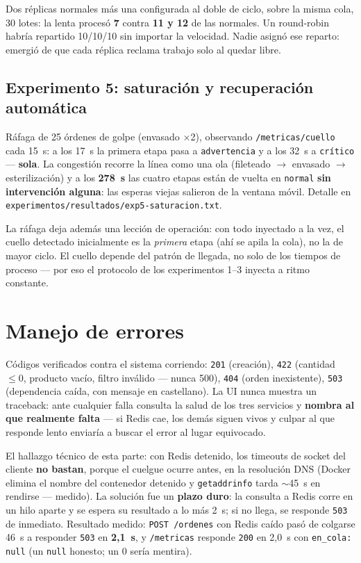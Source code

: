 \documentclass[12pt,a4paper]{article}
\begin{document}
Dos réplicas normales más una configurada al doble de ciclo, sobre la misma
cola, 30 lotes: la lenta procesó \textbf{7} contra \textbf{11 y 12} de las
normales. Un round-robin habría repartido 10/10/10 sin importar la velocidad.
Nadie asignó ese reparto: emergió de que cada réplica reclama trabajo solo al
quedar libre.

\subsection{Experimento 5: saturación y recuperación automática}

Ráfaga de 25 órdenes de golpe (envasado $\times$2), observando
\texttt{/metricas/cuello} cada 15~s: a los 17~s la primera etapa pasa a
\texttt{advertencia} y a los 32~s a \texttt{crítico} — \textbf{sola}. La
congestión recorre la línea como una ola (fileteado $\to$ envasado $\to$
esterilización) y a los \textbf{278~s} las cuatro etapas están de vuelta en
\texttt{normal} \textbf{sin intervención alguna}: las esperas viejas salieron
de la ventana móvil. Detalle en \texttt{experimentos/resultados/exp5-saturacion.txt}.

La ráfaga deja además una lección de operación: con todo inyectado a la vez, el
cuello detectado inicialmente es la \emph{primera} etapa (ahí se apila la
cola), no la de mayor ciclo. El cuello depende del patrón de llegada, no solo
de los tiempos de proceso — por eso el protocolo de los experimentos 1--3
inyecta a ritmo constante.

\section{Manejo de errores}

Códigos verificados contra el sistema corriendo: \texttt{201} (creación),
\texttt{422} (cantidad $\leq 0$, producto vacío, filtro inválido — nunca 500),
\texttt{404} (orden inexistente), \texttt{503} (dependencia caída, con mensaje
en castellano). La UI nunca muestra un traceback: ante cualquier falla consulta
la salud de los tres servicios y \textbf{nombra al que realmente falta} — si
Redis cae, los demás siguen vivos y culpar al que responde lento enviaría a
buscar el error al lugar equivocado.

El hallazgo técnico de esta parte: con Redis detenido, los timeouts de socket
del cliente \textbf{no bastan}, porque el cuelgue ocurre antes, en la
resolución DNS (Docker elimina el nombre del contenedor detenido y
\texttt{getaddrinfo} tarda $\sim$45~s en rendirse — medido). La solución fue un
\textbf{plazo duro}: la consulta a Redis corre en un hilo aparte y se espera su
resultado a lo más 2~s; si no llega, se responde \texttt{503} de inmediato.
Resultado medido: \texttt{POST /ordenes} con Redis caído pasó de colgarse 46~s
a responder \texttt{503} en \textbf{2{,}1~s}, y \texttt{/metricas} responde
\texttt{200} en 2{,}0~s con \texttt{en\_cola: null} (un \texttt{null} honesto;
un 0 sería mentira).
\end{document}
